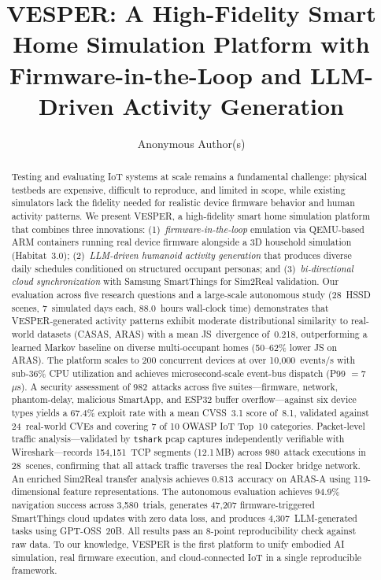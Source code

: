 \documentclass[sigconf,anonymous]{acmart}
\title{VESPER: A High-Fidelity Smart Home Simulation Platform with
Firmware-in-the-Loop and LLM-Driven Activity Generation}
\author{Anonymous Author(s)}
\affiliation{%
  \institution{Anonymous Institution}
  \country{United States}
}
\newcommand{\sys}{\textsc{VESPER}}
\begin{document}
\begin{abstract}
Testing and evaluating IoT systems at scale remains a fundamental
challenge: physical testbeds are expensive, difficult to reproduce,
and limited in scope, while existing simulators lack the fidelity
needed for realistic device firmware behavior and human activity
patterns.  We present \sys{}, a high-fidelity smart home simulation
platform that combines three innovations:
(1)~\emph{firmware-in-the-loop} emulation via QEMU-based ARM
containers running real device firmware alongside a 3D household
simulation (Habitat~3.0);
(2)~\emph{LLM-driven humanoid activity generation} that produces
diverse daily schedules conditioned on structured
occupant personas; and
(3)~\emph{bi-directional cloud synchronization} with Samsung
SmartThings for Sim2Real validation.
Our evaluation across five research questions and a large-scale
autonomous study (28~HSSD scenes, 7~simulated days each,
88.0~hours wall-clock time) demonstrates
that \sys{}-generated activity patterns exhibit moderate distributional
similarity to real-world datasets (CASAS, ARAS) with a mean
JS~divergence of~0.218, outperforming a learned Markov baseline
on diverse multi-occupant homes (50--62\% lower JS on ARAS).
The platform scales to 200 concurrent devices at over
10{,}000~events/s with sub-36\% CPU utilization and achieves
microsecond-scale event-bus dispatch (P99 $= 7$\,$\mu$s).
A security assessment of 982~attacks across five suites---firmware,
network, phantom-delay, malicious SmartApp, and ESP32 buffer
overflow---against six device types yields a 67.4\% exploit rate
with a mean CVSS~3.1 score of~8.1, validated against 24~real-world
CVEs and covering 7 of 10 OWASP IoT Top~10 categories.
Packet-level traffic analysis---validated by \texttt{tshark}
pcap captures independently verifiable with Wireshark---records
154{,}151~TCP segments (12.1\,MB) across 980~attack executions
in 28~scenes, confirming that all attack traffic traverses the
real Docker bridge network.
An enriched Sim2Real transfer analysis achieves 0.813~accuracy
on ARAS-A using 119-dimensional feature representations.
The autonomous evaluation achieves 94.9\%
navigation success across 3{,}580~trials, generates
47{,}207 firmware-triggered SmartThings cloud updates with zero data
loss, and produces 4{,}307~LLM-generated tasks using GPT-OSS~20B.
All results pass an 8-point reproducibility check against raw data.
To our knowledge, \sys{} is the first platform to unify embodied
AI simulation, real firmware execution, and cloud-connected IoT
in a single reproducible framework.
\end{abstract}
\end{document}
